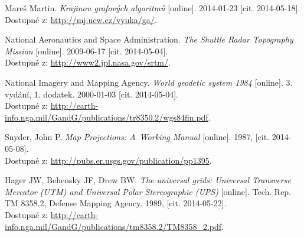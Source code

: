 \begin{thebibliography}{99}
	{\sc Mareš} Martin.
	\emph{Krajinou grafových algoritmů} [online]. 
	2014-01-23 [cit. 2014-05-18]. \\
	Dostupné z:	\url{http://mj.ucw.cz/vyuka/ga/}.

	{\sc National Aeronautics and Space Administration.}
	\emph{The Shuttle Radar Topography Mission} [online]. 
	2009-06-17 [cit. 2014-05-04]. \\
	Dostupné z: \url{http://www2.jpl.nasa.gov/srtm/}.

	{\sc National Imagery and Mapping Agency.}
	\emph{World geodetic system 1984} [online]. 
	3. vydání, 1. dodatek.
	2000-01-03 [cit. 2014-05-04]. \\
	Dostupné z: \url{http://earth-info.nga.mil/GandG/publications/tr8350.2/wgs84fin.pdf}.

	{\sc Snyder,} John P.
	\emph{Map Projections: A~Working Manual} [online]. 
	1987, [cit. 2014-05-08]. \\
	Dostupné z: \url{http://pubs.er.usgs.gov/publication/pp1395}.

	{\sc Hager} JW, {\sc Behensky} JF, {\sc Drew} BW.
	\emph{The universal grids: Universal Transverse Mercator (UTM) and Universal 
	Polar Stereographic (UPS)} [online].
	Tech. Rep. TM 8358.2, Defense Mapping Agency.
	1989, [cit. 2014-05-22].\\
	Dostupné z: \url{http://earth-info.nga.mil/GandG/publications/tm8358.2/TM8358_2.pdf}.

	

\end{thebibliography}
